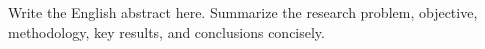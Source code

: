 \begin{sutabstracten}
Write the English abstract here. Summarize the research problem, objective, methodology, key results, and conclusions concisely.
\end{sutabstracten}
